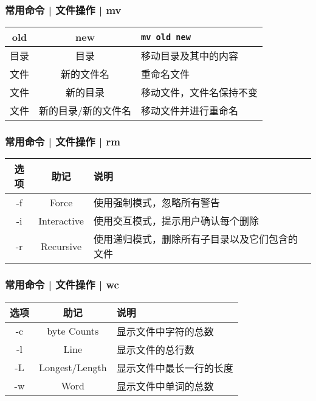\begin{frame}[fragile]
  \frametitle{常用命令 | 文件操作 | \alert{mv}}
  \begin{table}
    \centering
    \begin{tabularx}{0.9\textwidth}{ccX}
      \hline
      \rowcolor{blue!50}old & new & \verb|mv old new|\\
      \hline
      目录 & 目录 & 移动目录及其中的内容\\
      文件 & 新的文件名 & 重命名文件\\
      文件 & 新的目录 & 移动文件，文件名保持不变\\
      文件 & 新的目录/新的文件名 & 移动文件并进行重命名\\
      \hline
    \end{tabularx}
  \end{table}
\end{frame}

\begin{frame}[fragile]
  \frametitle{常用命令 | 文件操作 | \alert{rm}}
  \begin{table}
    \centering
    \begin{tabularx}{0.9\textwidth}{ccX}
      \hline
      \rowcolor{blue!50}选项 & 助记 & 说明\\
      \hline
      -f & Force & 使用强制模式，忽略所有警告\\
      -i & Interactive & 使用交互模式，提示用户确认每个删除\\
      -r & Recursive & 使用递归模式，删除所有子目录以及它们包含的文件\\
      \hline
    \end{tabularx}
  \end{table}
\end{frame}

\begin{frame}[fragile]
  \frametitle{常用命令 | 文件操作 | \alert{wc}}
  \begin{table}
    \centering
    \begin{tabularx}{0.9\textwidth}{ccX}
      \hline
      \rowcolor{blue!50}选项 & 助记 & 说明\\
      \hline
      -c & byte Counts & 显示文件中字符的总数\\
      -l & Line & 显示文件的总行数\\
      -L & Longest/Length & 显示文件中最长一行的长度\\
      -w & Word & 显示文件中单词的总数\\
      \hline
    \end{tabularx}
  \end{table}
\end{frame}

